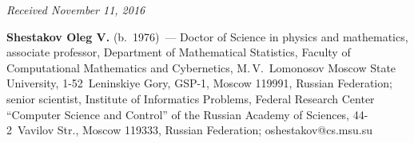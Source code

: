 \vspace*{-3pt}

\hfill{\small\textit{Received November 11, 2016}}

\vspace*{-12pt}

\Contrl

\noindent
\textbf{Shestakov Oleg V.} (b.\ 1976)~--- 
Doctor of Science in physics and mathematics, associate professor, 
Department of Mathematical Statistics, Faculty of Computational Mathematics 
and Cybernetics, M.\,V.~Lomonosov Moscow State University, 1-52~Leninskiye Gory,
 GSP-1, Moscow 119991, Russian Federation; senior scientist, 
 Institute of Informatics Problems, Federal Research Center 
 ``Computer Science and Control'' of the Russian Academy of Sciences, 44-2~Vavilov Str., 
 Moscow 119333, Russian Federation; \mbox{oshestakov@cs.msu.su}
\label{end\stat}


\renewcommand{\bibname}{\protect\rm Литература} 